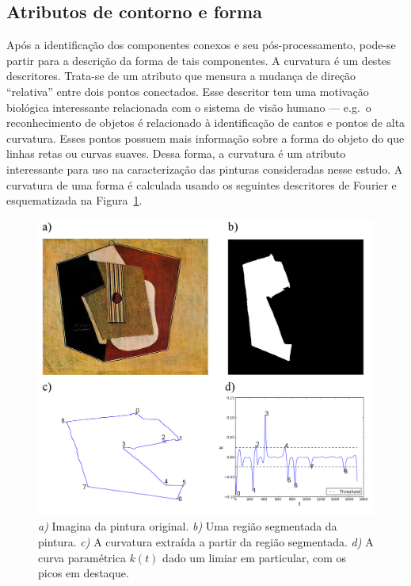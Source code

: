 \subsection{Atributos de contorno e forma}

Após a identificação dos componentes conexos e seu pós-processamento, pode-se
partir para a descrição da forma de tais componentes. A curvatura é um destes
descritores. Trata-se de um atributo que mensura a mudança de direção
``relativa'' entre dois pontos conectados. Esse descritor tem uma motivação
biológica interessante relacionada com o sistema de visão humano --- e.g.\ o
reconhecimento de objetos é relacionado à identificação de cantos e pontos de
alta curvatura. Esses pontos possuem mais informação sobre a forma do objeto do
que linhas retas ou curvas suaves. Dessa forma, a curvatura é um atributo
interessante para uso na caracterização das pinturas consideradas nesse
estudo. A curvatura de uma forma é calculada usando os seguintes descritores de
Fourier e esquematizada na Figura~\ref{fig:curvatura}.~\cite{luciano} 

\begin{figure}[h!]
\begin{center}
        \includegraphics[width=\columnwidth]{figs/curvatura}
      \caption{\textit{a)} Imagina da pintura original. \textit{b)} Uma região
        segmentada da pintura. \textit{c)} A curvatura extraída a partir
        da região segmentada. \textit{d)} A curva paramétrica $k(t)$ dado um
        limiar em particular, com os picos em destaque.}
        \label{fig:curvatura}
\end{center}
\end{figure}

